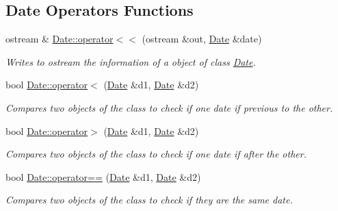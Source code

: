 \subsection*{Date Operators Functions}
\begin{DoxyCompactItemize}
\item 
ostream \& \hyperlink{group___date_ga277b4ff7a5bea855f71b2b7f941fbc2f}{Date\+::operator$<$$<$} (ostream \&out, \hyperlink{class_date}{Date} \&date)
\begin{DoxyCompactList}\small\item\em Writes to ostream the information of a object of class \hyperlink{class_date}{Date}. \end{DoxyCompactList}\item 
bool \hyperlink{group___date_ga532ae38442ee586783b532725767634a}{Date\+::operator$<$} (\hyperlink{class_date}{Date} \&d1, \hyperlink{class_date}{Date} \&d2)
\begin{DoxyCompactList}\small\item\em Compares two objects of the class to check if one date if previous to the other. \end{DoxyCompactList}\item 
bool \hyperlink{group___date_ga3d72003c210f3adc692715148aa7cf26}{Date\+::operator$>$} (\hyperlink{class_date}{Date} \&d1, \hyperlink{class_date}{Date} \&d2)
\begin{DoxyCompactList}\small\item\em Compares two objects of the class to check if one date if after the other. \end{DoxyCompactList}\item 
bool \hyperlink{group___date_gaa932959bdd56052bc683d29b8748898f}{Date\+::operator==} (\hyperlink{class_date}{Date} \&d1, \hyperlink{class_date}{Date} \&d2)
\begin{DoxyCompactList}\small\item\em Compares two objects of the class to check if they are the same date. \end{DoxyCompactList}\end{DoxyCompactItemize}

